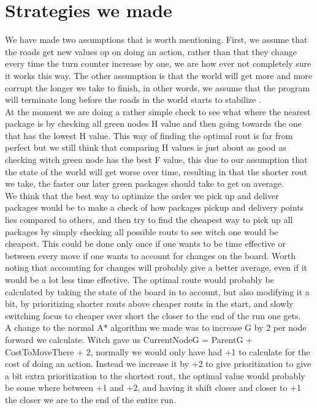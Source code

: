 \documentclass[12pt, a4paper]{article}
\begin{document}


\section{Strategies we made}
We have made two assumptions that is worth mentioning. First, we assume that the roads get new values op on doing an action, rather than that they change every time the turn counter increase by one, we are how ever not completely sure it works this way. The other assumption is that the world will get more and more corrupt the longer we take to finish, in other words, we assume that the program will terminate long before the roads in the world starts to stabilize  .\\

At the moment we are doing a rather simple check to see what where the nearest package is by checking all green nodes H value and then going towards the one that has the lowest H value. This way of finding the optimal rout is far from perfect but we still think that comparing H values is just about as good as checking witch green node has the best F value, this due to our assumption that the state of the world will get worse over time, resulting in that the shorter rout we take, the faster our later green packages should take to get on average.\\

We think that the best way to optimize the order we pick up and deliver packages would be to make a check of how packages pickup and delivery points lies compared to others, and then try to find the cheapest way to pick up all packages by simply checking all possible routs to see witch one would be cheapest. This could be done only once if one wants to be time effective or between every move if one wants to account for changes on the board. Worth noting that accounting for changes will probably give a better average, even if it would be a lot less time effective. The optimal route would probably be calculated by taking the state of the board in to account, but also modifying it a bit, by prioritizing shorter routs above cheaper routs in the start, and slowly switching focus to cheaper over short the closer to the end of the run one gets.\\

A change to the normal A* algorithm we made was to increase G by 2 per node forward we calculate. Witch gave us CurrentNodeG = ParentG + CostToMoveThere + 2, normally we would only have had +1 to calculate for the cost of doing an action. Instead we increase it by +2 to give prioritization to give a bit extra prioritization to the shortest rout, the optimal value would probably be some where between +1 and +2, and having it shift closer and closer to +1 the closer we are to the end of the entire run.
\end{document}
